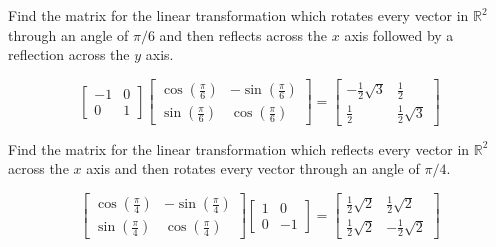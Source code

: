 \documentclass{ximera}
\begin{document}
\begin{problem}\label{prb:6.19} Find the matrix for the linear transformation which rotates every
vector in $\mathbb{R}^{2}$ through an angle of $\pi /6$ and then reflects
across the $x$ axis followed by a reflection across the $y$ axis.
\begin{hint}
\[
\left[
\begin{array}{rr}
-1 & 0 \\
0 & 1
\end{array}
\right] \left[
\begin{array}{cc}
\cos \left( \frac{\pi }{6}\right)  & -\sin \left( \frac{\pi }{6}\right)  \\
\sin \left( \frac{\pi }{6}\right)  & \cos \left( \frac{\pi }{6}\right)
\end{array}
\right] = \left[
\begin{array}{cc}
-\frac{1}{2}\sqrt{3} & \frac{1}{2} \\
\frac{1}{2} & \frac{1}{2}\sqrt{3}
\end{array}
\right]
\]
\end{hint}
\end{problem}

\begin{problem}\label{prb:6.20} Find the matrix for the linear transformation which reflects every
vector in $\mathbb{R}^{2}$ across the $x$ axis and then rotates every vector
through an angle of $\pi /4$.
\begin{hint}
\[
\left[
\begin{array}{cc}
\cos \left( \frac{\pi }{4}\right)  & -\sin \left( \frac{\pi }{4}\right)  \\
\sin \left( \frac{\pi }{4}\right)  & \cos \left( \frac{\pi }{4}\right)
\end{array}
\right] \left[
\begin{array}{rr}
1 & 0 \\
0 & -1
\end{array}
\right] = \left[
\begin{array}{cc}
\frac{1}{2}\sqrt{2} & \frac{1}{2}\sqrt{2} \\
\frac{1}{2}\sqrt{2} & -\frac{1}{2}\sqrt{2}
\end{array}
\right]
\]
\end{hint}
\end{problem}
\end{document}
